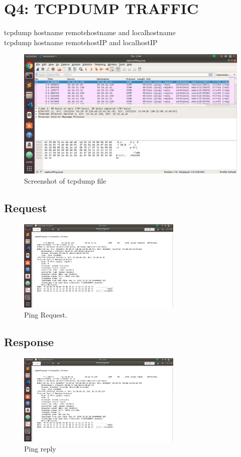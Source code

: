 \documentclass{article}
\begin{document}
\section{Q4: TCPDUMP TRAFFIC}
tcpdump hostname remotehostname and localhostname \\
tcpdump hostname remotehostIP and localhostIP 
 \begin{figure}[H]
 \centering
 \includegraphics[width=1.0\textwidth]{../Q4/Ping.png}
 \caption{\label{fig:PING}Screenshot of tcpdump file}
 \end{figure}

\subsection{Request}
 \begin{figure}[H]
 \centering
 \includegraphics[width=0.7\textwidth]{../Q4/request.png}
 \caption{\label{fig:REQUEST}Ping Request.}
 \end{figure}

\subsection{Response}
 \begin{figure}[H]
 \centering
 \includegraphics[width=0.7\textwidth]{../Q4/reply.png}
 \caption{\label{fig:REPLY}Ping reply}
 \end{figure}
\end{document}
